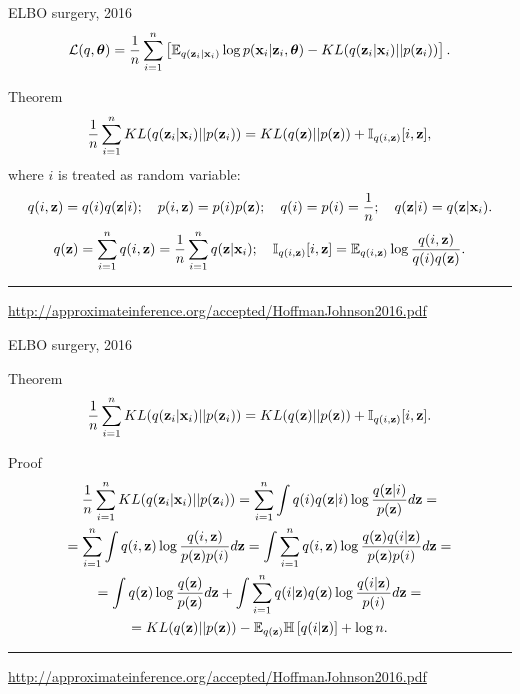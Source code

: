 \begin{frame}{ELBO surgery, 2016}
\vspace{-0.3cm}
\[
    \mathcal{L}(q, \boldsymbol{\theta}) = \frac{1}{n} \sum_{i=1}^n \left[ \mathbb{E}_{q(\mathbf{z}_i | \mathbf{x}_i)} \log p(\mathbf{x}_i | \mathbf{z}_i, \boldsymbol{\theta}) - KL(q(\mathbf{z}_i | \mathbf{x}_i) || p(\mathbf{z}_i)) \right].
\]
\vspace{-0.3cm}
\begin{block}{Theorem}
\[
    \frac{1}{n} \sum_{i=1}^n KL(q(\mathbf{z}_i | \mathbf{x}_i) || p(\mathbf{z}_i)) = KL(q(\mathbf{z}) || p(\mathbf{z})) + \mathbb{I}_{q(i, \mathbf{z})} [i, \mathbf{z}],
\]
where $i$ is treated as random variable:
\footnotesize{
\[
    q(i, \mathbf{z}) = q(i) q(\mathbf{z} | i); \quad p(i, \mathbf{z}) = p(i) p(\mathbf{z}); \quad 
    q(i) = p(i) = \frac{1}{n}; \quad q(\mathbf{z} | i) = q(\mathbf{z} | \mathbf{x}_i).
\]
\[
    q(\mathbf{z}) = \sum_{i=1}^n q(i, \mathbf{z}) = \frac{1}{n} \sum_{i=1}^n q(\mathbf{z} | \mathbf{x}_i); \quad  \mathbb{I}_{q(i, \mathbf{z})} [i, \mathbf{z}] = \mathbb{E}_{q(i, \mathbf{z})} \log \frac{q(i, \mathbf{z})}{q(i)q(\mathbf{z})}.
\]
}
\end{block}

\vfill
\hrule\medskip
{\scriptsize \href{http://approximateinference.org/accepted/HoffmanJohnson2016.pdf}{http://approximateinference.org/accepted/HoffmanJohnson2016.pdf}}
\end{frame}
\begin{frame}{ELBO surgery, 2016}
\begin{block}{Theorem}
\[
    \frac{1}{n} \sum_{i=1}^n KL(q(\mathbf{z}_i | \mathbf{x}_i) || p(\mathbf{z}_i)) = KL(q(\mathbf{z}) || p(\mathbf{z})) + \mathbb{I}_{q(i, \mathbf{z})} [i, \mathbf{z}].
\]
\end{block}
\begin{block}{Proof}
\vspace{-0.3cm}
{\footnotesize
\begin{multline*}
    \frac{1}{n} \sum_{i=1}^n KL(q(\mathbf{z}_i | \mathbf{x}_i) || p(\mathbf{z}_i)) = \sum_{i=1}^n \int q(i) q(\mathbf{z} | i) \log \frac{q(\mathbf{z} | i)}{p(\mathbf{z})} d \mathbf{z} = \\
    = \sum_{i=1}^n \int q(i, \mathbf{z}) \log \frac{q(i, \mathbf{z})}{p(\mathbf{z})p(i)} d \mathbf{z} =
    \int \sum_{i=1}^n q(i, \mathbf{z}) \log \frac{ q (\mathbf{z}) q(i | \mathbf{z}) }{p(\mathbf{z}) p(i) } d \mathbf{z} = \\
    = \int q(\mathbf{z}) \log \frac{q(\mathbf{z})}{p(\mathbf{z})} d\mathbf{z} + \int \sum_{i=1}^n q(i | \mathbf{z}) q(\mathbf{z}) \log \frac{q(i | \mathbf{z})}{p(i)} d \mathbf{z} = \\
    = KL (q(\mathbf{z}) || p(\mathbf{z})) - \mathbb{E}_{q(\mathbf{z})} \mathbb{H} \left[q(i | \mathbf{z})  \right] + \log n.
\end{multline*}
}
\end{block}
\vfill
\hrule\medskip
{\scriptsize \href{http://approximateinference.org/accepted/HoffmanJohnson2016.pdf}{http://approximateinference.org/accepted/HoffmanJohnson2016.pdf}}
\end{frame}
